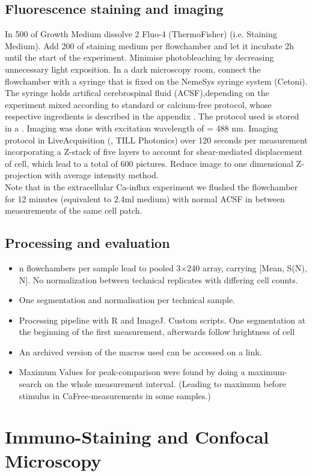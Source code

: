 \subsection{Fluorescence staining and imaging}
In 500\mul{} of Growth Medium dissolve 2\mul{} Fluo-4 (ThermoFisher) (i.e. Staining Medium). Add 200\mul{} of staining medium per flowchamber and let it incubate 2h until the start of the experiment. 
Minimise photobleaching by decreasing unnecessary light exposition. In a dark microscopy room, connect the flowchamber with a syringe that is fixed on the NemeSys syringe system (Cetoni). The syringe holds artifical cerebrospinal fluid (ACSF),depending on the experiment mixed according to standard or calcium-free protocol, whose respective ingredients is described in the appendix . The protocol used is stored in a \myworries{}. Imaging was done with excitation wavelength of \textlambda = 488 nm. Imaging protocol in LiveAcquisition (, TILL Photonics) over 120 seconds per measurement incorporating a Z-stack of five layers to account for shear-mediated displacement of cell, which lead to a total of 600 pictures. Reduce image to one dimensional Z-projection with average intensity method.  \\
Note that in the extracellular Ca-influx experiment we flushed the flowchamber for 12 minutes (equivalent to 2.4ml medium) with normal ACSF in between measurements of the same cell patch.


\subsection{Processing and evaluation}

\begin{itemize}
\item n flowchambers per sample lead to pooled 3$\times$240 array, carrying [Mean, S(N), N]. No normalization between technical replicates with differing cell counts. 
\item One segmentation and normalisation per technical sample.
\item Processing pipeline with R and ImageJ. Custom scripts. One segmentation at the beginning of the first measurement, afterwards follow brightness of cell
\item An archived version of the macros used can be accessed on a link.
\item Maximum Values for peak-comparison were found by doing a maximum-search on the whole measurement interval. (Leading to maximum before stimulus in CaFree-measurements in some samples.)
\end{itemize} 


\section{Immuno-Staining and Confocal Microscopy}

